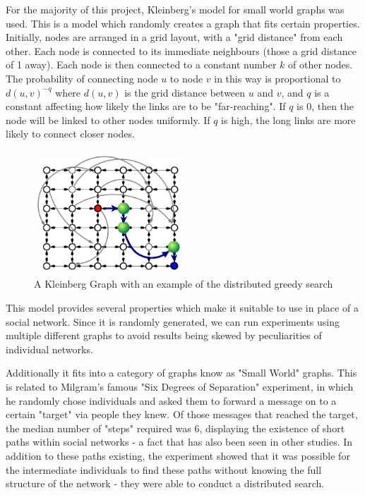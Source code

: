 \documentclass[bsc,frontabs,twoside,singlespacing,parskip,deptreport]{infthesis}     %
\begin{document}
For the majority of this project, Kleinberg's model for small world graphs was used\cite{Kleinberg00}. This is a model which randomly creates a graph that fits certain properties. Initially, nodes are arranged in a grid layout, with a "grid distance" from each other. Each node is connected to its immediate neighbours (those a grid distance of 1 away). Each node is then connected to a constant number $k$ of other nodes. The probability of connecting node $u$ to node $v$ in this way is proportional to $d(u, v)^{-q}$ where $d(u, v)$ is the grid distance between $u$ and $v$, and $q$ is a constant affecting how likely the links are to be "far-reaching". If $q$ is 0, then the node will be linked to other nodes uniformly. If $q$ is high, the long links are more likely to connect closer nodes.

\begin{figure}[ht]
  \centering
    \includegraphics[width=0.5\textwidth]{Schabanel11_Kleinbergs_Network}
  \caption{A Kleinberg Graph with an example of the distributed greedy search\cite{Schabanel11}}
\end{figure}

This model provides several properties which make it suitable to use in place of a social network. Since it is randomly generated, we can run experiments using multiple different graphs to avoid results being skewed by peculiarities of individual networks. 

Additionally it fits into a category of graphs know as "Small World" graphs. This is related to Milgram's famous "Six Degrees of Separation" experiment\cite{Milgram67,TraversMilgram69}, in which he randomly chose individuals and asked them to forward a message on to a certain "target" via people they knew. Of those messages that reached the target, the median number of "steps" required was 6, displaying the existence of short paths within social networks - a fact that has also been seen in other studies\cite{MilgramBackup1,MilgramBackup2}. In addition to these paths existing, the experiment showed that it was possible for the intermediate individuals to find these paths without knowing the full structure of the network - they were able to conduct a distributed search. 
\end{document}
